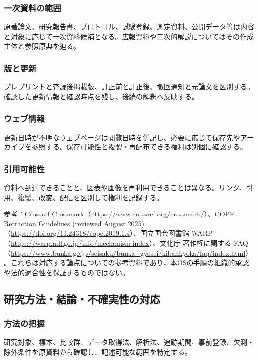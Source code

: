 \documentclass[a4paper,11pt]{article}
\begin{document}
\subsubsection{一次資料の範囲}
\par 原著論文、研究報告書、プロトコル、試験登録、測定資料、公開データ等は内容と対象に応じて一次資料候補となる。広報資料や二次的解説についてはその作成主体と参照原典を辿る。\par\medskip
\subsubsection{版と更新}
\par プレプリントと査読後掲載版、訂正前と訂正後、撤回通知と元論文を区別する。確認した更新情報と確認時点を残し、後続の解釈へ反映する。\par\medskip
\subsubsection{ウェブ情報}
\par 更新日時が不明なウェブページは閲覧日時を併記し、必要に応じて保存先やアーカイブを参照する。保存可能性と複製・再配布できる権利は別個に確認する。\par\medskip
\subsubsection{引用可能性}
\par 資料へ到達できることと、図表や画像を再利用できることは異なる。リンク、引用、複製、改変、配信を区別して権利を記録する。\par\medskip
\par 参考：Crossref Crossmark（\url{https://www.crossref.org/crossmark/}）、COPE Retraction Guidelines (reviewed August 2025)（\url{https://doi.org/10.24318/cope.2019.1.4}）、国立国会図書館 WARP（\url{https://warp.ndl.go.jp/info/mechanism-index}）、文化庁 著作権に関する FAQ（\url{https://www.bunka.go.jp/seisaku/bunka_gyosei/kibankyoka/faq/index.html}）。これらは対応する論点についての参考資料であり、本OSの手順の組織的承認や法的適合性を保証するものではない。\par\medskip
\subsection{研究方法・結論・不確実性の対応}
\subsubsection{方法の把握}
\par 研究対象、標本、比較群、データ取得法、解析法、追跡期間、事前登録、欠測・除外条件を原資料から確認し、記述可能な範囲を特定する。\par\medskip
\end{document}
